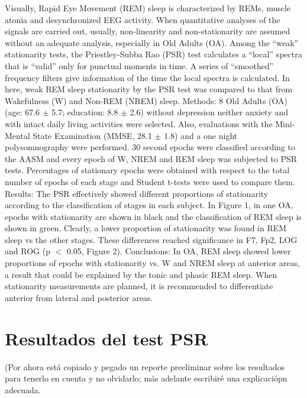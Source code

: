 \documentclass[12pt,a4paper]{mitthesis}
\begin{document}
Visually, Rapid Eye Movement (REM) sleep is characterized by REMs, muscle atonia and 
desynchronized EEG activity. When quantitative analyses of the signals are carried out, usually, 
non-linearity and non-stationarity are assumed without an adequate analysis, especially in 
Old Adults (OA). Among the “weak” stationarity tests, the Priestley-Subba Rao (PSR) test 
calculates a “local” spectra that is “valid” only for punctual moments in time. A series of 
“smoothed” frequency filters give information of the time the local spectra is calculated. 
In here, weak REM sleep stationarity by the PSR test was compared to that from Wakefulness (W) 
and Non-REM (NREM) sleep. Methods:  8 Old Adults (OA) 
(age: 67.6 $\pm$ 5.7; education: 8.8 $\pm$ 2.6) 
without depression neither anxiety and with intact daily living activities were selected. Also, 
evaluations with the Mini-Mental State Examination (MMSE, 28.1 $\pm$ 1.8) and a one night 
polysomnography were performed. 30 second epochs were classified according to the AASM and every 
epoch of W, NREM and REM sleep was subjected to PSR tests. Percentages of stationary epochs were 
obtained with respect to the total number of epochs of each stage and Student t-tests were used 
to compare them. Results: The PSR effectively showed different proportions of stationarity 
according to the classification of stages in each subject. In Figure 1, in one OA, epochs with 
stationarity are shown in black and the classification of REM sleep is shown in green. Clearly, 
a lower proportion of stationarity was found in REM sleep vs the other stages. These differences 
reached significance in F7, Fp2, LOG and ROG (p $<$ 0.05, Figure 2). Conclusions: In OA, REM sleep 
showed lower proportions of epochs with stationarity vs. W and NREM sleep at anterior areas, a 
result that could be explained by the tonic and phasic REM sleep. When stationarity measurements 
are planned, it is recommended to differentiate anterior from lateral and posterior areas.


\section{Resultados del test PSR}

(Por ahora est\'a copiado y pegado un reporte preeliminar sobre los resultados
para tenerlo en cuenta y no olvidarlo; m\'as adelante
escribir\'e una explicaci\'opn adecuada.
\end{document}
